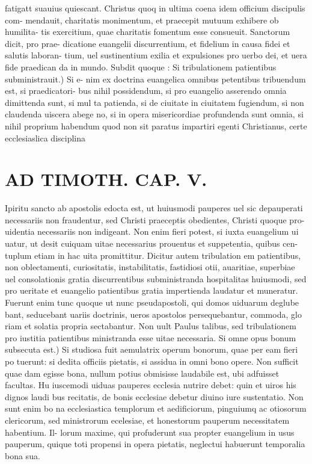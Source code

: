 \documentclass{article}
\begin{document}
\begin{pages}
fatigatt suauius quiescant. Christus quoq in ultima coena idem officium discipulis com- mendauit, charitatis monimentum, et praecepit mutuum exhibere ob humilita- tis exercitium, quae charitatis fomentum esse consueuit. Sanctorum dicit, pro prae- dicatione euangelii discurrentium, et fidelium in causa fidei et salutis laboran- tium, uel sustinentium exilia et expulsiones pro uerbo dei, et uera fide praedican da in mundo. Subdit quoque : Si tribulationem patientibus subministrauit.) Si e- nim ex doctrina euangelica omnibus petentibus tribuendum est, si praedicatori- bus nihil possidendum, si pro euangelio asserendo omnia dimittenda sunt, si mul ta patienda, si de ciuitate in ciuitatem fugiendum, si non claudenda uiscera abege no, si in opera misericordiae profundenda sunt omnia, si nihil proprium habendum quod non sit paratus impartiri egenti Christianus, certe ecclesiaslica disciplina  \pend
\section*{AD TIMOTH. CAP. V. }
\marginpar{[ p.519 ]}\pstart Ipiritu sancto ab apostolis edocta est, ut huiusmodi pauperes uel sic depauperati necessariis non fraudentur, sed Christi praeceptis obedientes, Christi quoque pro- uidentia necessariis non indigeant. Non enim fieri potest, si iuxta euangelium ui uatur, ut desit cuiquam uitae necessarius prouentus et suppetentia, quibus cen- tuplum etiam in hac uita promittitur. Dicitur autem tribulation em patientibus, non oblectamenti, curiositatis, instabilitatis, fastidiosi otii, auaritiae, superbiae uel consolationis gratia discurrentibus subministranda hospitalitas huiusmodi, sed pro ueritate et euangelio patientibus gratia impertienda laudatur et muneratur. Fuerunt enim tunc quoque ut nunc pseudapostoli, qui domos uiduarum deglube bant, seducebant uariis doctrinis, ueros apostolos persequebantur, commoda, glo riam et solatia propria sectabantur. Non uult Paulus talibus, sed tribulationem pro iustitia patientibus ministranda esse uitae necessaria. Si omne opus bonum subsecuta est.) Si studiosa fuit aemulatrix operum bonorum, quae per eam fieri po tuerunt: si dedita officiis pietatis, si assidua in omni bono opere. Non sufficit quae dam egisse bona, nullum potius obmisisse laudabile est, ubi adfuisset facultas. Hu iuscemodi uiduas pauperes ecclesia nutrire debet: quin et uiros his dignos laudi bus recitatis, de bonis ecclesiae debetur diuino iure sustentatio. Non sunt enim bo na ecclesiastica templorum et aedificiorum, pinguiumq ac otiosorum clericorum, sed ministrorum ecelesiae, et honestorum pauperum necessitatem habentium. Il- lorum maxime, qui profuderunt sua propter euangelium in usus pauperum, quique  toti propensi in opera pietatis, neglectui habuerunt temporalia bona sua.  \pend
{}
{}

\end{pages}
\end{document}
